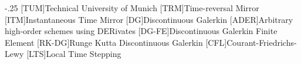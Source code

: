 \documentclass[headsepline,footsepline,footinclude=false,fontsize=11pt,paper=a4,listof=totoc,bibliography=totoc,BCOR=12mm,DIV=12]{scrbook} %
\begin{document}


\frontmatter{}


\cleardoublepage



\tableofcontents{}

\mainmatter{}










\appendix{}


\begin{acronym}
	\itemsep-.25\baselineskip
	[TUM]{Technical University of Munich}
	[TRM]{Time-reversal Mirror}
	[ITM]{Instantaneous Time Mirror}
	[DG]{Discontinuous Galerkin}
	[ADER]{Arbitrary high-order schemes using DERivates}
	[DG-FE]{Discontinuous Galerkin Finite Element}
	[RK-DG]{Runge Kutta Discontinuous Galerkin}
	[CFL]{Courant-Friedrichs-Lewy}
	[LTS]{Local Time Stepping}
\end{acronym}

\listoffigures{}
\listoftables{}
\printbibliography{}
\end{document}
